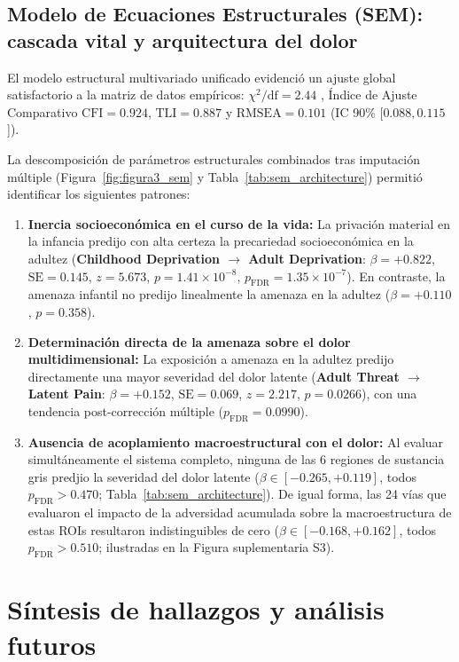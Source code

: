 \documentclass[11pt,a4paper]{article}
\begin{document}
\subsection{Modelo de Ecuaciones Estructurales (SEM): cascada vital y arquitectura del dolor}
El modelo estructural multivariado unificado evidenció un ajuste global satisfactorio a la matriz de datos empíricos: $\chi^2 / \text{df} =
2.44$ , Índice de Ajuste Comparativo $\text{CFI} = 0.924$, $\text{TLI} = 0.887$ y $\text{RMSEA} = 0.101$ (IC 90\% [$0.088, 0.115$]).

La descomposición de parámetros estructurales combinados tras imputación múltiple (Figura~\ref{fig:figura3_sem} y Tabla~\ref{tab:sem_architecture})
permitió identificar los siguientes patrones: 
\begin{enumerate}
  \item \textbf{Inercia socioeconómica en el curso de la vida:} La privación material en la infancia predijo con alta certeza la precariedad 
  socioeconómica en la adultez (\textbf{Childhood Deprivation $\to$ Adult Deprivation}: $\beta = +0.822$, $\text{SE} = 0.145$, $z = 5.673$, 
  $p = 1.41 \times 10^{-8}$, $p_{\text{FDR}} = 1.35 \times 10^{-7}$). En contraste, la amenaza infantil no predijo linealmente la amenaza en 
  la adultez ($\beta = +0.110$, $p = 0.358$).
  \item \textbf{Determinación directa de la amenaza sobre el dolor multidimensional:} La exposición a amenaza en la adultez predijo directamente 
  una mayor severidad del dolor latente (\textbf{Adult Threat $\to$ Latent Pain}: $\beta = +0.152$, $\text{SE} = 0.069$, $z = 2.217$, 
  $p = 0.0266$), con una tendencia post-corrección múltiple ($p_{\text{FDR}} = 0.0990$).
  \item \textbf{Ausencia de acoplamiento macroestructural con el dolor:} Al evaluar simultáneamente el sistema completo, ninguna de las 6 regiones de
  sustancia gris predjio la severidad del dolor latente ($\beta \in [-0.265, +0.119]$, todos $p_{\text{FDR}} > 0.470$; Tabla~\ref{tab:sem_architecture}).
  De igual forma, las 24 vías que evaluaron el impacto de la adversidad acumulada sobre la macroestructura de estas ROIs resultaron indistinguibles de cero 
  ($\beta \in [-0.168, +0.162]$, todos $p_{\text{FDR}} > 0.510$; ilustradas en la Figura suplementaria S3).
\end{enumerate}


\section{Síntesis de hallazgos y análisis futuros}
\end{document}
